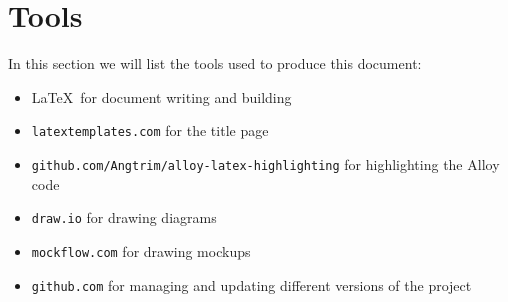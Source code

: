 \documentclass[12pt]{article}
\begin{document}

\clearpage

\nonumber

\tableofcontents
\clearpage

\pagestyle{fancy}
\fancyhead[LE,RO]{\slshape \rightmark}
\fancyhead[LO,RE]{\slshape \leftmark}
\renewcommand{\footrulewidth}{0.3pt}
\cfoot{}


\clearpage


\clearpage


\clearpage


\clearpage


\clearpage


\clearpage


\clearpage

\section*{Tools}

  In this section we will list the tools used to produce this document:
  \begin{itemize}[noitemsep]
    \item \LaTeX\ for document writing and building

    \item \texttt{latextemplates.com} for the title page

    \item \texttt{github.com/Angtrim/alloy-latex-highlighting} for highlighting the Alloy code

    \item \texttt{draw.io} for drawing diagrams

    \item \texttt{mockflow.com} for drawing mockups

    \item \texttt{github.com} for managing and updating different versions of the project

  \end{itemize}


\end{document}
